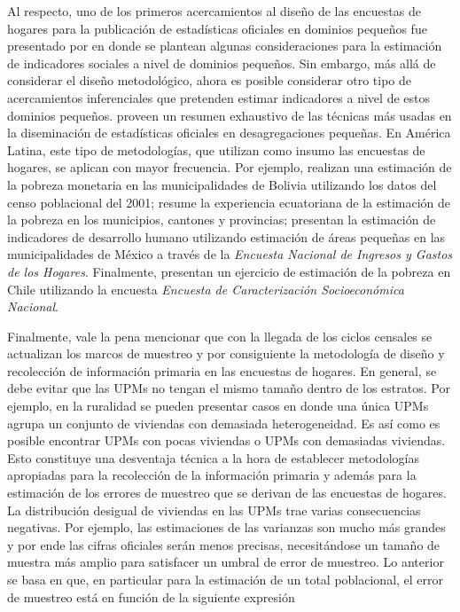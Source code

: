 Al respecto, uno de los primeros acercamientos al diseño de las encuestas de hogares para la publicación de estadísticas oficiales en dominios pequeños fue presentado por \citet{Sinngh_Gambino_Mantel_1994} en donde se plantean algunas consideraciones para la estimación de indicadores sociales a nivel de dominios pequeños. Sin embargo, más allá de considerar el diseño metodológico, ahora es posible considerar otro tipo de acercamientos inferenciales que pretenden estimar indicadores a nivel de estos dominios pequeños. \citet{Rao_Molina_2014} proveen un resumen exhaustivo de las técnicas más usadas en la diseminación de estadísticas oficiales en desagregaciones pequeñas. En América Latina, este tipo de metodologías, que utilizan como insumo las encuestas de hogares, se aplican con mayor frecuencia. Por ejemplo, \citet{arias2007geography} realizan una estimación de la pobreza monetaria en las municipalidades de Bolivia utilizando los datos del censo poblacional del 2001; \citet{araujo20071990} resume la experiencia ecuatoriana de la estimación de la pobreza en los municipios, cantones y provincias; \citet{lopez2007poverty} presentan la estimación de indicadores de desarrollo humano utilizando estimación de áreas pequeñas en las municipalidades de México a través de la \emph{Encuesta Nacional de Ingresos y Gastos de los Hogares}. Finalmente, \citet{Casas_Cordero_Valencia_Encina_Lahiri_2016} presentan un ejercicio de estimación de la pobreza en Chile utilizando la encuesta \emph{Encuesta de Caracterización Socioeconómica Nacional}.

Finalmente, vale la pena mencionar que con la llegada de los ciclos censales se actualizan los marcos de muestreo y por consiguiente la metodología de diseño y recolección de información primaria en las encuestas de hogares. En general, se debe evitar que las UPMs no tengan el mismo tamaño dentro de los estratos. Por ejemplo, en la ruralidad se pueden presentar casos en donde una única UPMs agrupa un conjunto de viviendas con demasiada heterogeneidad. Es así como es posible encontrar UPMs con pocas viviendas o UPMs con demasiadas viviendas. Esto constituye una desventaja técnica a la hora de establecer metodologías apropiadas para la recolección de la información primaria y además para la estimación de los errores de muestreo que se derivan de las encuestas de hogares. La distribución desigual de viviendas en las UPMs trae varias consecuencias negativas. Por ejemplo, las estimaciones de las varianzas son mucho más grandes y por ende las cifras oficiales serán menos precisas, necesitándose un tamaño de muestra más amplio para satisfacer un umbral de error de muestreo. Lo anterior se basa en que, en particular para la estimación de un total poblacional, el error de muestreo está en función de la siguiente expresión

